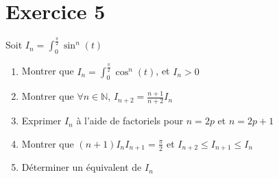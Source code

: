 \documentclass[11pt]{article}
\begin{document}
\section*{Exercice 5}

Soit $I_n =\int_0^{\frac{\pi}{2}} \sin^n(t)$

\begin{enumerate}
\item Montrer que $I_n =\int_0^{\frac{\pi}{2}} \cos^n(t)$, et $I_n>0$
\item Montrer que $\forall n\in \mathbb{N}$, $I_{n+2}=\frac{n+1}{n+2}I_n$
\item Exprimer $I_n$ à l'aide de factoriels pour $n=2p$ et $n=2p+1$
\item Montrer que $(n+1)I_{n}I_{n+1}=\frac{\pi}{2}$ et $I_{n+2}\leq I_{n+1}\leq I_{n}$
\item Déterminer un équivalent de $I_n$
\end{enumerate}
\end{document}
